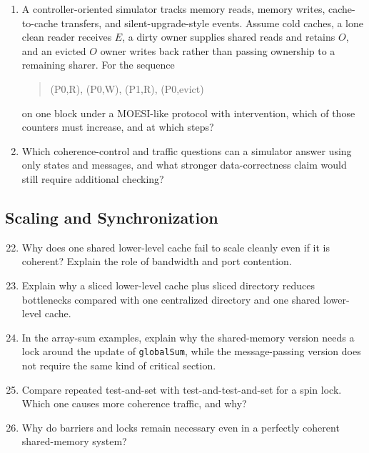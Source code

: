 \begin{enumerate}
    A dirty owner supplies another cache directly; clean read misses use memory, and upgrades from a current $S$ or $O$ copy require permission but no new data transfer.
    Compare two cases: (a) $X$ and $Y$ are in the same cache block, and (b) $X$ and $Y$ are in different blocks.
    Which case causes more cache-to-cache transfers and why?
    Which case better avoids false sharing?
    \item A controller-oriented simulator tracks memory reads, memory writes, cache-to-cache transfers, and silent-upgrade-style events.
    Assume cold caches, a lone clean reader receives $E$, a dirty owner supplies shared reads and retains $O$, and an evicted $O$ owner writes back rather than passing ownership to a remaining sharer.
    For the sequence
    \begin{quote}
                \ttfamily
                (P0,R), (P0,W), (P1,R), (P0,evict)
    \end{quote}
    on one block under a MOESI-like protocol with intervention, which of those counters must increase, and at which steps?
    \item Which coherence-control and traffic questions can a simulator answer using only states and messages, and what stronger data-correctness claim would still require additional checking?
\end{enumerate}

\subsection*{Scaling and Synchronization}
\begin{enumerate}
    \setcounter{enumi}{21}
    \setlength{\itemsep}{0.35em}
    \item Why does one shared lower-level cache fail to scale cleanly even if it is coherent?
    Explain the role of bandwidth and port contention.
    \item Explain why a sliced lower-level cache plus sliced directory reduces bottlenecks compared with one centralized directory and one shared lower-level cache.
    \item In the array-sum examples, explain why the shared-memory version needs a lock around the update of \texttt{globalSum}, while the message-passing version does not require the same kind of critical section.
    \item Compare repeated test-and-set with test-and-test-and-set for a spin lock.
    Which one causes more coherence traffic, and why?
    \item Why do barriers and locks remain necessary even in a perfectly coherent shared-memory system?
\end{enumerate}
